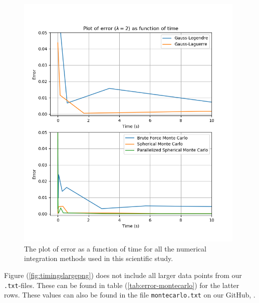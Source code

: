 \documentclass{article}
\begin{document}
\begin{figure}[ht]
    \centering
    \includegraphics[width = 11cm]{images/method-timings-small.png}
    \caption{The plot of error as a function of time for all the numerical integration methods used in this scientific study. }
    \label{fig:timingssmallpng}
\end{figure}

Figure (\ref{fig:timingslargepng}) does not include all larger data points from our \texttt{.txt}-files. These can be found in table (\ref{tab:error-montecarlo}) for the latter rows. These values can also be found in the file \texttt{montecarlo.txt} on our GitHub, \cite{github}. \\

\vspace{3cm}
\end{document}
